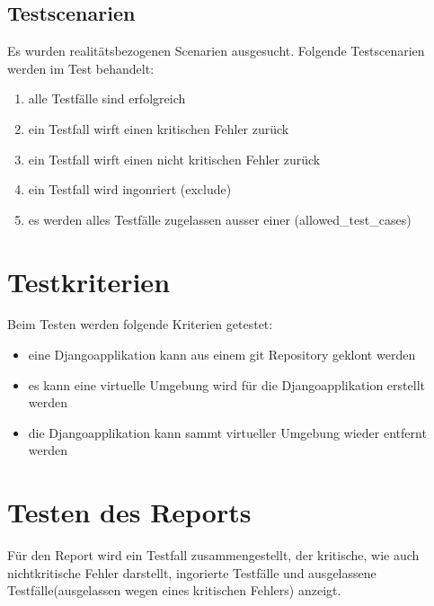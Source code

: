 \subsection{Testscenarien}
Es wurden realitätsbezogenen Scenarien ausgesucht. 
Folgende Testscenarien werden im Test behandelt:
\begin{enumerate}
    \item alle Testfälle sind erfolgreich 
    \item ein Testfall wirft einen kritischen Fehler zurück
    \item ein Testfall wirft einen nicht kritischen Fehler zurück
    \item ein Testfall wird ingonriert (exclude)
    \item es werden alles Testfälle zugelassen ausser einer (allowed\_test\_cases) 
\end{enumerate}

\section{Testkriterien}
Beim Testen werden folgende Kriterien getestet:
\begin{itemize}
    \item eine Djangoapplikation kann aus einem git Repository geklont werden
    \item es kann eine virtuelle Umgebung wird für die Djangoapplikation erstellt werden
    \item die Djangoapplikation kann sammt virtueller Umgebung wieder entfernt werden
\end{itemize}

\section{Testen des Reports}
Für den Report wird ein Testfall zusammengestellt, der kritische, wie auch nichtkritische Fehler darstellt, ingorierte Testfälle und ausgelassene Testfälle(ausgelassen wegen eines kritischen Fehlers) anzeigt.
